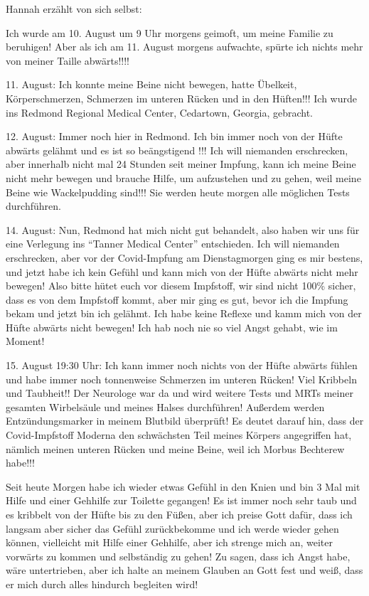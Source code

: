 Hannah erzählt von sich selbst:

Ich wurde am 10. August um 9 Uhr morgens geimoft, um meine Familie zu beruhigen!
Aber als ich am 11. August morgens aufwachte, spürte ich nichts mehr von meiner
Taille abwärts!!!!

11. August: Ich konnte meine Beine nicht bewegen, hatte Übelkeit,
Körperschmerzen, Schmerzen im unteren Rücken und in den Hüften!!! Ich wurde ins
Redmond Regional Medical Center, Cedartown, Georgia, gebracht.

12. August: Immer noch hier in Redmond. Ich bin immer noch von der Hüfte abwärts
gelähmt und es ist so beängstigend !!! Ich will niemanden erschrecken, aber
innerhalb nicht mal 24 Stunden seit meiner Impfung, kann ich meine Beine nicht
mehr bewegen und brauche Hilfe, um aufzustehen und zu gehen, weil meine Beine
wie Wackelpudding sind!!! Sie werden heute morgen alle möglichen Tests
durchführen.

14. August: Nun, Redmond hat mich nicht gut behandelt, also haben wir uns für
eine Verlegung ins ``Tanner Medical Center'' entschieden. Ich will niemanden
erschrecken, aber vor der Covid-Impfung am Dienstagmorgen ging es mir bestens,
und jetzt habe ich kein Gefühl und kann mich von der Hüfte abwärts nicht mehr
bewegen! Also bitte hütet euch vor diesem Impfstoff, wir sind nicht 100\%
sicher, dass es von dem Impfstoff kommt, aber mir ging es gut, bevor ich die
Impfung bekam und jetzt bin ich gelähmt. Ich habe keine Reflexe und kamm mich
von der Hüfte abwärts nicht bewegen! Ich hab noch nie so viel Angst gehabt, wie
im Moment!

15. August 19:30 Uhr: Ich kann immer noch nichts von der Hüfte abwärts fühlen
und habe immer noch tonnenweise Schmerzen im unteren Rücken! Viel Kribbeln und
Taubheit!! Der Neurologe war da und wird weitere Tests und MRTs meiner gesamten
Wirbelsäule und meines Halses durchführen! Außerdem werden Entzündungsmarker in
meinem Blutbild überprüft! Es deutet darauf hin, dass der Covid-Impfstoff
Moderna den schwächsten Teil meines Körpers angegriffen hat, nämlich meinen
unteren Rücken und meine Beine, weil ich Morbus Bechterew habe!!!

Seit heute Morgen habe ich wieder etwas Gefühl in den Knien und bin 3 Mal mit
Hilfe und einer Gehhilfe zur Toilette gegangen! Es ist immer noch sehr taub und
es kribbelt von der Hüfte bis zu den Füßen, aber ich preise Gott dafür, dass ich
langsam aber sicher das Gefühl zurückbekomme und ich werde wieder gehen können,
vielleicht mit Hilfe einer Gehhilfe, aber ich strenge mich an, weiter vorwärts
zu kommen und selbständig zu gehen! Zu sagen, dass ich Angst habe, wäre
untertrieben, aber ich halte an meinem Glauben an Gott fest und weiß, dass er
mich durch alles hindurch begleiten wird!

